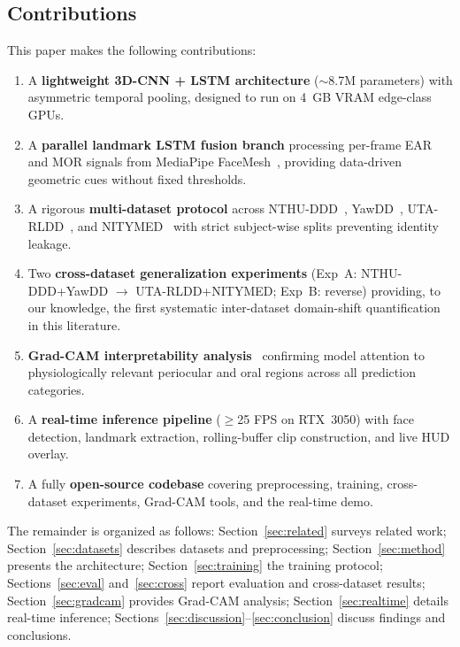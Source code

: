\documentclass[journal]{IEEEtran}
\begin{document}
\subsection{Contributions}
This paper makes the following contributions:
\begin{enumerate}[leftmargin=*, label=\arabic*)]
  \item A \textbf{lightweight 3D-CNN + LSTM architecture} ($\sim$8.7M parameters) with asymmetric temporal pooling, designed to run on 4~GB VRAM edge-class GPUs.
  \item A \textbf{parallel landmark LSTM fusion branch} processing per-frame EAR and MOR signals from MediaPipe FaceMesh~\cite{mediapipe2019}, providing data-driven geometric cues without fixed thresholds.
  \item A rigorous \textbf{multi-dataset protocol} across NTHU-DDD~\cite{ghoddoosian2019}, YawDD~\cite{abtahi2014}, UTA-RLDD~\cite{ghoddoosian2019}, and NITYMED~\cite{nitymed2020} with strict subject-wise splits preventing identity leakage.
  \item Two \textbf{cross-dataset generalization experiments} (Exp~A: NTHU-DDD+YawDD $\rightarrow$ UTA-RLDD+NITYMED; Exp~B: reverse) providing, to our knowledge, the first systematic inter-dataset domain-shift quantification in this literature.
  \item \textbf{Grad-CAM interpretability analysis}~\cite{selvaraju2017} confirming model attention to physiologically relevant periocular and oral regions across all prediction categories.
  \item A \textbf{real-time inference pipeline} ($\geq$25 FPS on RTX~3050) with face detection, landmark extraction, rolling-buffer clip construction, and live HUD overlay.
  \item A fully \textbf{open-source codebase} covering preprocessing, training, cross-dataset experiments, Grad-CAM tools, and the real-time demo.
\end{enumerate}

The remainder is organized as follows: Section~\ref{sec:related} surveys related work; Section~\ref{sec:datasets} describes datasets and preprocessing; Section~\ref{sec:method} presents the architecture; Section~\ref{sec:training} the training protocol; Sections~\ref{sec:eval} and~\ref{sec:cross} report evaluation and cross-dataset results; Section~\ref{sec:gradcam} provides Grad-CAM analysis; Section~\ref{sec:realtime} details real-time inference; Sections~\ref{sec:discussion}--\ref{sec:conclusion} discuss findings and conclusions.
\end{document}
